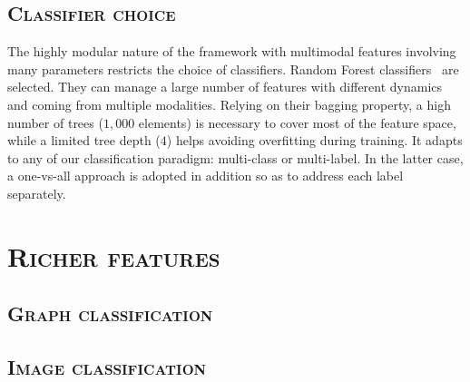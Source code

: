     \subsection{\textsc{Classifier choice}}
        The highly modular nature of the framework with multimodal features involving many parameters restricts the choice of classifiers.
        Random Forest classifiers~\parencite{breiman2001random,criminisi2013decision} are selected.
        They can manage a large number of features with different dynamics and coming from multiple modalities.
        Relying on their bagging property, a high number of trees ($1,000$ elements) is necessary to cover most of the feature space, while a limited tree depth ($4$) helps avoiding overfitting during training.
        It adapts to any of our classification paradigm: multi-class or multi-label.
        In the latter case, a one-vs-all approach is adopted in addition so as to address each label separately.

\section{\textsc{Richer features}}
    \subsection{\textsc{Graph classification}}
    \subsection{\textsc{Image classification}}
